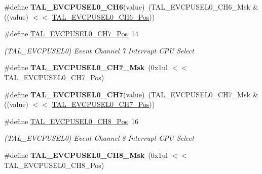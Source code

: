 \begin{DoxyCompactItemize}
\item 
\hypertarget{group___s_a_m_l21___t_a_l_ga779f98af07dda794ab9db85780e32279}{}\#define {\bfseries T\+A\+L\+\_\+\+E\+V\+C\+P\+U\+S\+E\+L0\+\_\+\+C\+H6}(value)~(T\+A\+L\+\_\+\+E\+V\+C\+P\+U\+S\+E\+L0\+\_\+\+C\+H6\+\_\+\+Msk \& ((value) $<$$<$ \hyperlink{group___s_a_m_l21___t_a_l_gaa2ea00b54043fbb66325a0e72d95e509}{T\+A\+L\+\_\+\+E\+V\+C\+P\+U\+S\+E\+L0\+\_\+\+C\+H6\+\_\+\+Pos}))\label{group___s_a_m_l21___t_a_l_ga779f98af07dda794ab9db85780e32279}

\item 
\hypertarget{group___s_a_m_l21___t_a_l_ga10e24178be05538a992541df8689e800}{}\#define \hyperlink{group___s_a_m_l21___t_a_l_ga10e24178be05538a992541df8689e800}{T\+A\+L\+\_\+\+E\+V\+C\+P\+U\+S\+E\+L0\+\_\+\+C\+H7\+\_\+\+Pos}~14\label{group___s_a_m_l21___t_a_l_ga10e24178be05538a992541df8689e800}

\begin{DoxyCompactList}\small\item\em (T\+A\+L\+\_\+\+E\+V\+C\+P\+U\+S\+E\+L0) Event Channel 7 Interrupt C\+P\+U Select \end{DoxyCompactList}\item 
\hypertarget{group___s_a_m_l21___t_a_l_gab6ba9fcd4548be054052681c26341882}{}\#define {\bfseries T\+A\+L\+\_\+\+E\+V\+C\+P\+U\+S\+E\+L0\+\_\+\+C\+H7\+\_\+\+Msk}~(0x1ul $<$$<$ T\+A\+L\+\_\+\+E\+V\+C\+P\+U\+S\+E\+L0\+\_\+\+C\+H7\+\_\+\+Pos)\label{group___s_a_m_l21___t_a_l_gab6ba9fcd4548be054052681c26341882}

\item 
\hypertarget{group___s_a_m_l21___t_a_l_ga136b38c7ad362a92acb0fe375b53c7de}{}\#define {\bfseries T\+A\+L\+\_\+\+E\+V\+C\+P\+U\+S\+E\+L0\+\_\+\+C\+H7}(value)~(T\+A\+L\+\_\+\+E\+V\+C\+P\+U\+S\+E\+L0\+\_\+\+C\+H7\+\_\+\+Msk \& ((value) $<$$<$ \hyperlink{group___s_a_m_l21___t_a_l_ga10e24178be05538a992541df8689e800}{T\+A\+L\+\_\+\+E\+V\+C\+P\+U\+S\+E\+L0\+\_\+\+C\+H7\+\_\+\+Pos}))\label{group___s_a_m_l21___t_a_l_ga136b38c7ad362a92acb0fe375b53c7de}

\item 
\hypertarget{group___s_a_m_l21___t_a_l_ga646064d1b5945df4c3ae3271acfa7f17}{}\#define \hyperlink{group___s_a_m_l21___t_a_l_ga646064d1b5945df4c3ae3271acfa7f17}{T\+A\+L\+\_\+\+E\+V\+C\+P\+U\+S\+E\+L0\+\_\+\+C\+H8\+\_\+\+Pos}~16\label{group___s_a_m_l21___t_a_l_ga646064d1b5945df4c3ae3271acfa7f17}

\begin{DoxyCompactList}\small\item\em (T\+A\+L\+\_\+\+E\+V\+C\+P\+U\+S\+E\+L0) Event Channel 8 Interrupt C\+P\+U Select \end{DoxyCompactList}\item 
\hypertarget{group___s_a_m_l21___t_a_l_ga56df4a355489a7a542011b4d26634acb}{}\#define {\bfseries T\+A\+L\+\_\+\+E\+V\+C\+P\+U\+S\+E\+L0\+\_\+\+C\+H8\+\_\+\+Msk}~(0x1ul $<$$<$ T\+A\+L\+\_\+\+E\+V\+C\+P\+U\+S\+E\+L0\+\_\+\+C\+H8\+\_\+\+Pos)\label{group___s_a_m_l21___t_a_l_ga56df4a355489a7a542011b4d26634acb}


\end{DoxyCompactItemize}

